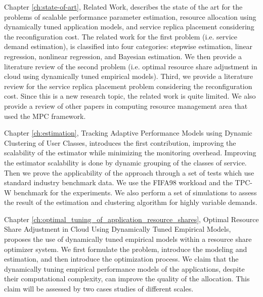   Chapter \ref{ch:state-of-art}, Related Work, describes the state of the art for the problems of scalable performance parameter estimation, resource allocation using dynamically tuned application models, and service replica placement considering the reconfiguration cost. 
 The related work for the first problem (i.e. service demand estimation), is classified into four categories: stepwise estimation, linear regression, nonlinear regression, and Bayesian estimation. We then provide a literature review of the second problem (i.e. optimal resource share adjustment in cloud using dynamically tuned empirical models). Third, we provide a literature review for the service replica placement problem considering the reconfiguration cost. Since this is a new research topic, the related work is quite limited. 
  We also provide a review of other papers in computing resource management area that used the MPC framework. 
	
  Chapter \ref{ch:estimation}, Tracking Adaptive Performance Models using Dynamic Clustering of User Classes, introduces the first contribution, improving the scalability of the estimator while minimizing the monitoring overhead. Improving the estimator scalability is done by dynamic grouping of the classes of service. 
	Then we prove the applicability of the approach through a set of tests which use standard industry benchmark data. We use the FIFA98 workload and the TPC-W benchmark for the experiments. We also perform a set of simulations to assess the result of the estimation and clustering algorithm for highly variable demands.  

Chapter \ref{ch:optimal_tuning_of_application_resource_shares}, Optimal Resource Share Adjustment in Cloud Using Dynamically Tuned Empirical Models, proposes the use of dynamically tuned empirical models within a resource share optimizer system. We first formulate the problem, introduce the modeling and estimation, and then introduce the optimization process. We claim that the dynamically tuning empirical performance models of the applications, despite their computational complexity, can improve the quality of the allocation.
This claim will be assessed by two cases studies of different scales. 

